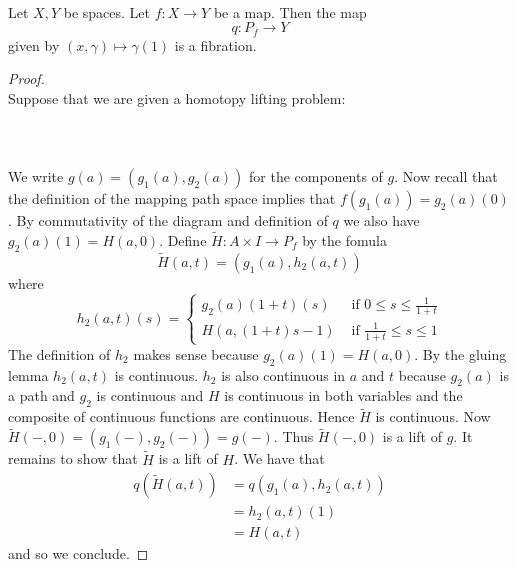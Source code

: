 \documentclass[a4paper]{article}
\begin{document}
\begin{prp}{}{}\\
Let $X,Y$ be spaces. Let $f:X\to Y$ be a map. Then the map $$q:P_f\to Y$$ given by $(x,\gamma)\mapsto\gamma(1)$ is a fibration. 
\begin{proof}\\
Suppose that we are given a homotopy lifting problem: \\~\\
\\~\\
We write $g(a)=(g_1(a),g_2(a))$ for the components of $g$. Now recall that the definition of the mapping path space implies that $f(g_1(a))=g_2(a)(0)$. By commutativity of the diagram and definition of $q$ we also have $g_2(a)(1)=H(a,0)$. Define $\tilde{H}:A\times I\to P_f$ by the fomula $$\tilde{H}(a,t)=(g_1(a),h_2(a,t))$$ where $$h_2(a,t)(s)=\begin{cases}
g_2(a)(1+t)(s) & \text{ if }0\leq s\leq\frac{1}{1+t}\\
H(a,(1+t)s-1) & \text{ if }\frac{1}{1+t}\leq s\leq 1
\end{cases}$$ The definition of $h_2$ makes sense because $g_2(a)(1)=H(a,0)$. By the gluing lemma $h_2(a,t)$ is continuous. $h_2$ is also continuous in $a$ and $t$ because $g_2(a)$ is a path and $g_2$ is continuous and $H$ is continuous in both variables and the composite of continuous functions are continuous. Hence $\tilde{H}$ is continuous. Now $\tilde{H}(-,0)=(g_1(-),g_2(-))=g(-)$. Thus $\tilde{H}(-,0)$ is a lift of $g$. It remains to show that $\tilde{H}$ is a lift of $H$. We have that 
\begin{align*}
q(\tilde{H}(a,t))&=q(g_1(a),h_2(a,t))\\
&=h_2(a,t)(1)\\
&=H(a,t)
\end{align*}
and so we conclude. 
\end{proof}
\end{prp}
\end{document}
